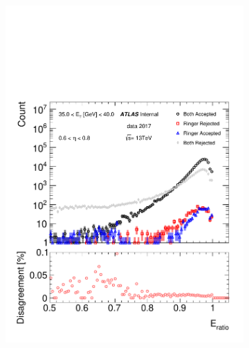 \begin{figure}[h!]
\begin{subfigure}[c]{.49\textwidth}
\includegraphics[width=\textwidth]{sections/04_analysis/figures/quadrant_plots/eratio.pdf}
\caption{}
\end{subfigure}
\hfill
\begin{subfigure}[c]{.49\textwidth}
\centering

\end{subfigure}
\end{figure}
